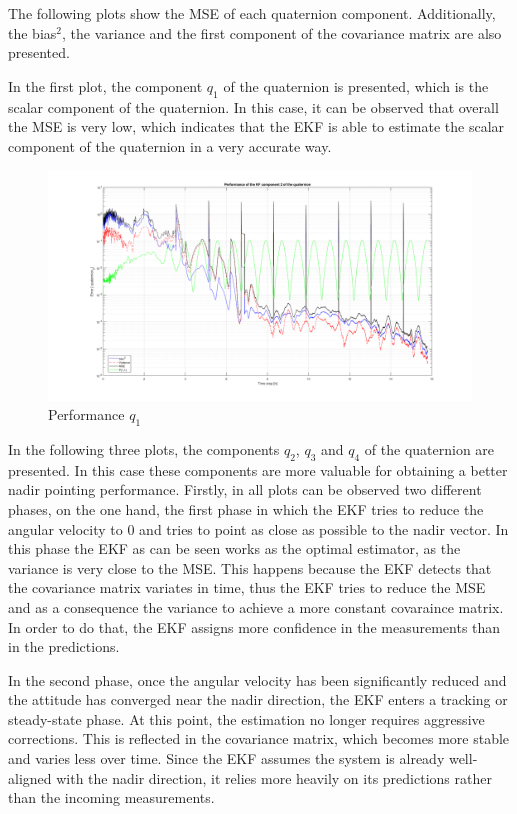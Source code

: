 \begin{itemize}
    The following plots show the MSE of each quaternion component. Additionally, the bias$^2$, the variance and the first component
    of the covariance matrix are also presented.

    In the first plot, the component $q_1$ of the quaternion is presented, which is the scalar component of the quaternion. In this case,
    it can be observed that overall the MSE is very low, which indicates that the EKF is able to estimate the scalar component of the quaternion in a very accurate way.
     
    \begin{figure}[H]
        \centering
        \includegraphics[width=\linewidth]{res/img/Nadir_EKF/EKF_performance/performance q1.png}
        \caption{Performance $q_1$}
        \label{fig:EKF_PerformanceQ1}
    \end{figure}

    In the following three plots, the components $q_2$, $q_3$ and $q_4$ of the quaternion are presented. In this case these components
    are more valuable for obtaining a better nadir pointing performance. Firstly, in all plots can be observed two different phases, 
    on the one hand, the first phase in which the EKF tries to reduce the angular velocity to 0 and tries to point as close as possible to 
    the nadir vector. In this phase the EKF as can be seen works as the optimal estimator, as the variance is very close to the MSE. This happens
    because the EKF detects that the covariance matrix variates in time, thus the EKF tries to reduce the MSE and as a 
    consequence the variance to achieve a more constant covaraince matrix. In order to do that, the EKF assigns more confidence in the measurements 
    than in the predictions.

    In the second phase, once the angular velocity has been significantly reduced and the attitude has converged near the nadir direction, 
    the EKF enters a tracking or steady-state phase. At this point, the estimation no longer requires aggressive corrections. This is reflected in 
    the covariance matrix, which becomes more stable and varies less over time.
    Since the EKF assumes the system is already well-aligned with the nadir direction, it relies more heavily on its predictions rather than the incoming measurements. 



\end{itemize}
